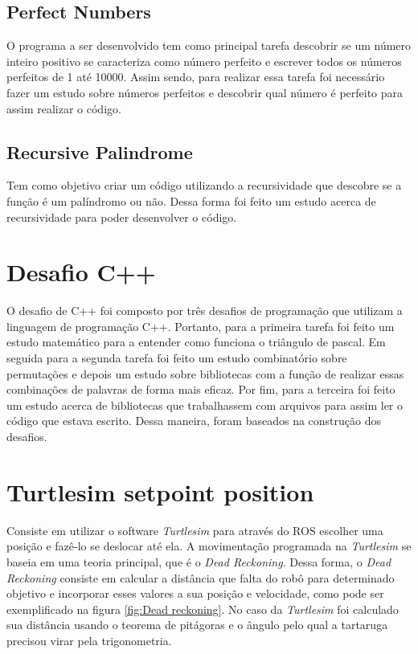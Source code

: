 \subsection{Perfect Numbers}

O programa a ser desenvolvido tem como principal tarefa descobrir se um número inteiro positivo se caracteriza como número perfeito e escrever todos os números perfeitos de 1 até 10000. Assim sendo, para realizar essa tarefa foi necessário fazer um estudo sobre números perfeitos e descobrir qual número é perfeito para assim realizar o código.

\subsection{Recursive Palindrome}

Tem como objetivo criar um código utilizando a recursividade que descobre se a função é um palíndromo ou não. Dessa forma foi feito um estudo acerca de recursividade para poder desenvolver o código.


\section{Desafio C++}
O desafio de C++ foi composto por três desafios de programação que utilizam a linguagem de programação C++. Portanto, para a primeira tarefa foi feito um estudo matemático para a entender como funciona o triângulo de pascal. Em seguida para a segunda tarefa foi feito um estudo combinatório sobre permutações e depois um estudo sobre bibliotecas  com a função de realizar essas combinações de palavras de forma mais eficaz. Por fim, para a terceira foi feito um estudo acerca de bibliotecas que trabalhassem com arquivos para assim ler o código que estava escrito. Dessa maneira, foram baseados na construção dos desafios.

\section{Turtlesim setpoint position}
Consiste em utilizar o software \textit{Turtlesim} para através do ROS escolher uma posição e fazê-lo se deslocar até ela. A movimentação programada na \textit{Turtlesim} se baseia em uma teoria principal, que é o \textit{Dead Reckoning}. Dessa forma, o \textit{Dead Reckoning} consiste em calcular a distância que falta do robô para determinado objetivo e incorporar esses valores a sua posição e velocidade, como pode ser exemplificado na figura \ref{fig:Dead reckoning}. No caso da \textit{Turtlesim} foi calculado sua distância usando o teorema de pitágoras e o ângulo pelo qual a tartaruga precisou virar pela trigonometria.

